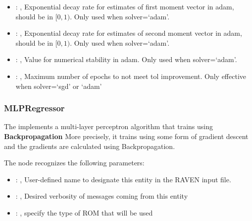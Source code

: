 \begin{itemize}
    \item {}: , 
      Exponential decay rate for estimates of first moment vector in adam, should be in $[0, 1)$.
      Only used when solver=`adam'.

    \item {}: , 
      Exponential decay rate for estimates of second moment vector in adam, should be in $[0, 1)$.
      Only used when solver=`adam'.

    \item {}: , 
      Value for numerical stability in adam. Only used when solver=`adam'.

    \item {}: , 
      Maximum number of epochs to not meet tol improvement. Only effective when
      solver=`sgd' or `adam'
  \end{itemize}


\subsubsection{MLPRegressor}
  The  implements a multi-layer perceptron algorithm that trains using
  \textbf{Backpropagation}                             More precisely, it trains using some form of
  gradient descent and the gradients are calculated using Backpropagation.

  The  node recognizes the following parameters:
    \begin{itemize}
      \item {}: , 
        User-defined name to designate this entity in the RAVEN input file.
      \item {}: , 
        Desired verbosity of messages coming from this entity
      \item {}: , 
        specify the type of ROM that will be used
  \end{itemize}


